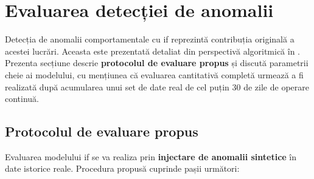 \section{Evaluarea detecției de anomalii}
\label{sec:eval-anomalii}

Detecția de anomalii comportamentale cu \gls{if} reprezintă contribuția originală a acestei
lucrări. Aceasta este prezentată detaliat din perspectivă algoritmică în .
Prezenta secțiune descrie \textbf{protocolul de evaluare propus} și discută parametrii cheie ai
modelului, cu mențiunea că evaluarea cantitativă completă urmează a fi realizată după acumularea
unui set de date real de cel puțin 30 de zile de operare continuă.

\subsection{Protocolul de evaluare propus}

Evaluarea modelului \gls{if} se va realiza prin \textbf{injectare de anomalii sintetice} în date
istorice reale. Procedura propusă cuprinde pașii următori:

